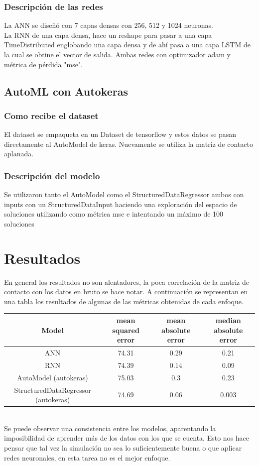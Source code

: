 \documentclass{article}
\begin{document}
\subsubsection*{Descripción de las redes}
La ANN se diseñó con 7 capas densas con 256, 512 y 1024 neuronas.\\
La RNN de una capa densa, hace un reshape para pasar a una capa TimeDistributed englobando una capa densa y de ahí pasa a una capa LSTM de la cual se obtine el vector de salida.
Ambas redes con optimizador adam y métrica de pérdida "mse".

\subsection{AutoML con Autokeras}
\subsubsection*{Como recibe el dataset}
El dataset se empaqueta en un Dataset de tensorflow y estos datos se pasan directamente al AutoModel de keras.
Nuevamente se utiliza la matriz de contacto aplanada.

\subsubsection{Descripción del modelo}
Se utilizaron tanto el AutoModel como el StructuredDataRegressor ambos con inputs con un StructuredDataInput 
haciendo una exploración del espacio de soluciones utilizando como métrica mse e intentando un máximo de 100 soluciones 


\section{Resultados}
En general los resultados no son alentadores, la poca correlación de la matriz de contacto con los datos en bruto se hace notar.
A continuación se representan en una tabla los resultados de algunas de las métricas obtenidas de cada enfoque.\\


    \begin{tabular}{*{4}{|c}|}
        \hline
        Model &  mean squared error & mean absolute error & median absolute error  \\
         \hline
         ANN & 74.31 & 0.29 & 0.21 \\ 
         \hline
         RNN & 74.39 & 0.14 & 0.09\\ 
         \hline
         AutoModel (autokeras) & 75.03 & 0.3 & 0.23 \\ 
         \hline
         StructuredDataRegressor (autokeras) & 74.69 & 0.06 & 0.003\\ 
         \hline 
    \end{tabular}
\\
Se puede observar una consistencia entre los modelos, aparentando la imposibilidad de aprender más de los datos con los que se cuenta. Esto nos hace pensar que tal vez la simulación no sea lo suficientemente buena o que aplicar redes neuronales, en esta tarea no es el mejor enfoque.
\end{document}
